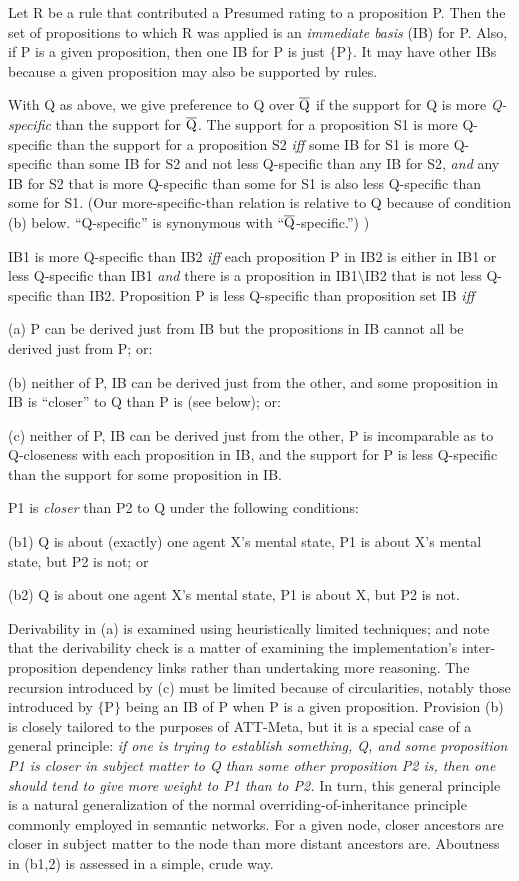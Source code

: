 Let R be a rule that contributed a Presumed rating to a proposition P.  Then
the set of propositions to which R was applied is an {\it immediate basis} (IB)
for P.  Also, if P is a given proposition, then one IB for P is just $\{$P$\}$.
It may have other IBs because a given proposition may also be supported by
rules.

With Q as above, we give preference to Q over $\overline{{\rm Q}}$ if the
support for Q is more {\it Q-specific} than the support for $\overline{{\rm
Q}}$.  The support for a proposition S1 is more Q-specific than the support for
a proposition S2 {\it iff} some IB for S1 is more Q-specific than some IB for
S2 and not less Q-specific than any IB for S2, {\it and} any IB for S2 that is
more Q-specific than some for S1 is also less Q-specific than some for S1.
(Our more-specific-than relation is relative to Q because of condition (b)
below.  ``Q-specific'' is synonymous with ``$\overline{{\rm Q}}$-specific.'')
)

IB1 is more Q-specific than IB2 {\it iff} each proposition P in IB2 is either in
IB1 or less Q-specific than IB1 {\it and} there is a proposition in
IB1$\setminus$IB2 that is not less Q-specific than IB2.  Proposition P is less
Q-specific than proposition set IB {\it iff}

(a) P can be derived just from IB but the propositions in IB cannot all be
derived just from P; or:

(b) neither of P, IB can be derived just from the other, and some proposition
in IB is ``closer'' to Q than P is (see below); or:

(c) neither of P, IB can be derived just from the other, P is incomparable as
to Q-closeness with each proposition in IB, and the support for P is less
Q-specific than the support for some proposition in IB.

P1 is {\it closer} than P2 to Q under the following conditions:

(b1) Q is about (exactly) one agent X's mental state, P1 is about X's mental state, but P2
is not; or

(b2) Q is about one agent X's mental state, P1 is about X, but P2 is not.

Derivability in (a) is examined using heuristically limited techniques; and
note that the derivability check is a matter of examining the implementation's
inter-proposition dependency links rather than undertaking more reasoning. The
recursion introduced by (c) must be limited because of circularities, notably
those introduced by $\{$P$\}$ being an IB of P when P is a given proposition.
Provision (b) is closely tailored to the purposes of ATT-Meta, but it is a
special case of a general principle: {\it if one is trying to establish
something, Q, and some proposition P1 is closer in subject matter to Q than
some other proposition P2 is, then one should tend to give more weight to P1
than to P2.} In turn, this general principle is a natural generalization of the
normal overriding-of-inheritance principle commonly employed in semantic
networks. For a given node, closer ancestors are closer in subject matter to
the node than more distant ancestors are. Aboutness in (b1,2) is assessed in a
simple, crude way.

